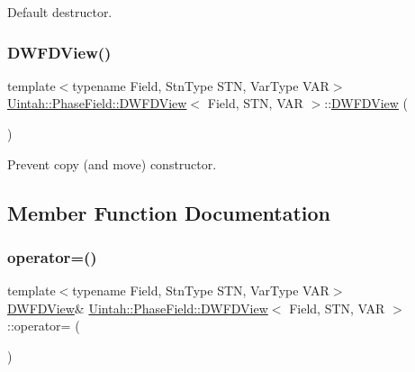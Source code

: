 Default destructor. 

\mbox{\label{classUintah_1_1PhaseField_1_1DWFDView_ad30db301c5aea2f86106ef63e71eca9e}} 
\subsubsection{\texorpdfstring{D\+W\+F\+D\+View()}{DWFDView()}\hspace{0.1cm}{\footnotesize\ttfamily [3/3]}}
{\footnotesize\ttfamily template$<$typename Field, Stn\+Type S\+TN, Var\+Type V\+AR$>$ \\
\hyperlink{classUintah_1_1PhaseField_1_1DWFDView}{Uintah\+::\+Phase\+Field\+::\+D\+W\+F\+D\+View}$<$ Field, S\+TN, V\+AR $>$\+::\hyperlink{classUintah_1_1PhaseField_1_1DWFDView}{D\+W\+F\+D\+View} (\begin{DoxyParamCaption}\item[{const \hyperlink{classUintah_1_1PhaseField_1_1DWFDView}{D\+W\+F\+D\+View}$<$ Field, S\+TN, V\+AR $>$ \&}]{ }\end{DoxyParamCaption})\hspace{0.3cm}{\ttfamily [delete]}}



Prevent copy (and move) constructor. 



\subsection{Member Function Documentation}
\mbox{\label{classUintah_1_1PhaseField_1_1DWFDView_a00271ff47c904609a0ae22f27e4c382d}} 
\subsubsection{\texorpdfstring{operator=()}{operator=()}}
{\footnotesize\ttfamily template$<$typename Field, Stn\+Type S\+TN, Var\+Type V\+AR$>$ \\
\hyperlink{classUintah_1_1PhaseField_1_1DWFDView}{D\+W\+F\+D\+View}\& \hyperlink{classUintah_1_1PhaseField_1_1DWFDView}{Uintah\+::\+Phase\+Field\+::\+D\+W\+F\+D\+View}$<$ Field, S\+TN, V\+AR $>$\+::operator= (\begin{DoxyParamCaption}\item[{const \hyperlink{classUintah_1_1PhaseField_1_1DWFDView}{D\+W\+F\+D\+View}$<$ Field, S\+TN, V\+AR $>$ \&}]{ }\end{DoxyParamCaption})\hspace{0.3cm}{\ttfamily [delete]}}



